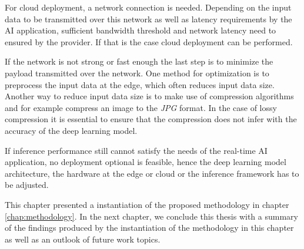 For cloud deployment, a network connection is needed. Depending on the input data to be transmitted over this network as well as latency requirements by the AI application, sufficient bandwidth threshold and network latency need to ensured by the provider. 
If that is the case cloud deployment can be performed.

If the network is not strong or fast enough the last step is to minimize the payload transmitted over the network.
One method for optimization is to preprocess the input data at the edge, which often reduces input data size. 
Another way to reduce input data size is to make use of compression algorithms and for example compress an image to the \emph{JPG} format.
In the case of lossy compression it is essential to ensure that the compression does not infer with the accuracy of the deep learning model.

If inference performance still cannot satisfy the needs of the real-time AI application, no deployment optional is feasible, hence the deep learning model architecture, the hardware at the edge or cloud or the inference framework has to be adjusted.





\vspace{0.5cm}
This chapter presented a instantiation of the proposed methodology in chapter \ref{chap:methodology}.
In the next chapter, we conclude this thesis with a summary of the findings produced by the instantiation of the methodology in this chapter as well as an outlook of future work topics.

\endinput 
